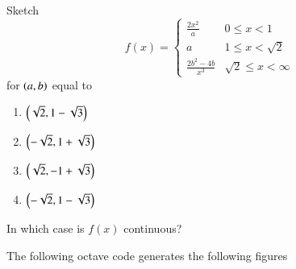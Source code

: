 \documentclass[journal,12pt,twocolumn]{IEEEtran}
\begin{document}
\begin{problem}
Sketch 
\begin{equation*}
f(x) = 
\begin{cases}
\frac{2x^2}{a} & 0 \leq x < 1\\
a & 1 \leq x < \sqrt{2} \\
\frac{2b^2 - 4b}{x^3} & \sqrt{2} \leq x < \infty
\end{cases}
\end{equation*}
for $\left(a,b\right)$ equal to 
\begin{enumerate}
\item $\left(\sqrt{2}, 1 - \sqrt{3}\right)$
\item $\left(-\sqrt{2}, 1 + \sqrt{3}\right)$
\item $\left(\sqrt{2},-1+\sqrt{3}\right)$
\item $\left(-\sqrt{2}, 1 - \sqrt{3}\right)$
\end{enumerate}
In which case is  $f(x)$ continuous?
\end{problem}
%
\solution The following octave code generates the following figures

\end{document}
